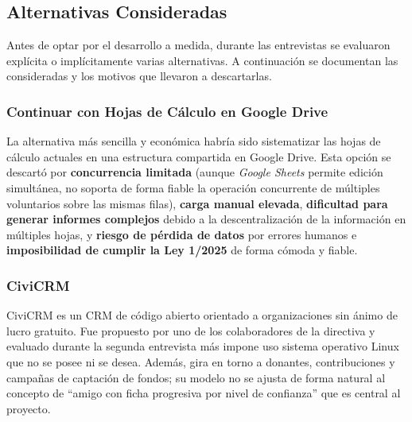 \subsection{Alternativas Consideradas}
Antes de optar por el desarrollo a medida, durante las entrevistas se
evaluaron explícita o implícitamente varias alternativas. A continuación se
documentan las consideradas y los motivos que llevaron a descartarlas.


\subsubsection{Continuar con Hojas de Cálculo en Google Drive}
La alternativa más sencilla y económica habría sido sistematizar las hojas
de cálculo actuales en una estructura compartida en Google Drive. Esta
opción se descartó por \textbf{concurrencia limitada} (aunque \textit{Google Sheets} permite edición
simultánea, no soporta de forma fiable la operación concurrente de
múltiples voluntarios sobre las mismas filas), \textbf{carga manual elevada}, \textbf{dificultad para generar informes complejos} 
debido a la descentralización de la información en múltiples hojas, y \textbf{riesgo de pérdida de datos} por errores humanos e 
\textbf{imposibilidad de cumplir la Ley 1/2025} de forma cómoda y fiable.


\subsubsection{CiviCRM}
CiviCRM es un CRM de código abierto orientado a organizaciones sin ánimo
de lucro gratuito. Fue propuesto por uno de los
colaboradores de la directiva y evaluado durante la segunda entrevista más impone 
uso sistema operativo Linux que no se posee ni se desea. Además, gira en torno a
donantes, contribuciones y campañas de captación de fondos; su modelo
no se ajusta de forma natural al concepto de ``amigo con ficha
progresiva por nivel de confianza'' que es central al proyecto.



